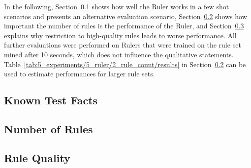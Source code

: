 In the following, Section~\ref{subsec:5_experiments/5_ruler/1_known} shows how well the Ruler works in a few shot scenarios and presents an alternative evaluation scenario, Section~\ref{subsec:5_experiments/5_ruler/2_rule_count} shows how important the number of rules is the performance of the Ruler, and Section~\ref{subsec:5_experiments/5_ruler/3_rule_quality} explains why restriction to high-quality rules leads to worse performance. All further evaluations were performed on Rulers that were trained on the rule set mined after 10 seconds, which does not influence the qualitative statements. Table~\ref{tab:5_experiments/5_ruler/2_rule_count/results} in Section~\ref{subsec:5_experiments/5_ruler/2_rule_count} can be used to estimate performances for larger rule sets.

\subsection{Known Test Facts}
\label{subsec:5_experiments/5_ruler/1_known}


\subsection{Number of Rules}
\label{subsec:5_experiments/5_ruler/2_rule_count}


\subsection{Rule Quality}
\label{subsec:5_experiments/5_ruler/3_rule_quality}


